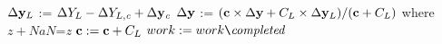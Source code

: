 \documentclass{article}
\renewcommand{\slash}{\texttt{\char`\\}}
\begin{document}
\begin{algorithm}[H]
{{{            $\Delta {\bf y}_L$ := $\Delta {Y}_L- \Delta {Y}_{L,{\it c}} + \Delta {\bf y}_{\it c}$
            $\Delta {\bf y}$ := $({\bf c} \times \Delta {\bf y} + C_L \times \Delta {\bf y}_L)/({\bf c} + C_L)$ where $z+NaN$={\it z}
            ${\bf c} := {\bf c} + C_L$
        }
    }
    $work := work \slash {\it completed}$\\
}
\\
\label{alg:CatStratPD}
\end{algorithm}


{\small

}
\end{document}
